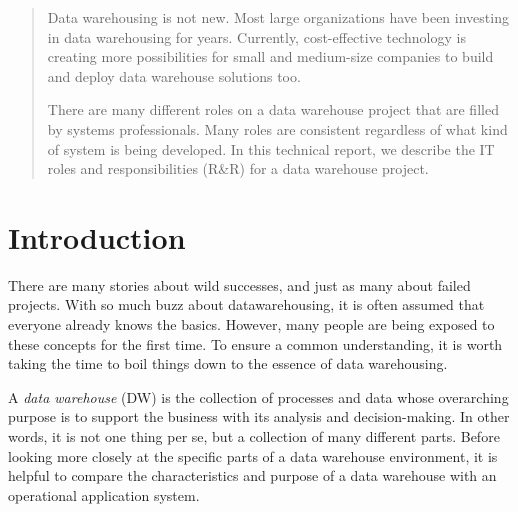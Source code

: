 \documentclass{vldb}
\begin{document}


\maketitle

\begin{abstract}
Data warehousing is not new. Most large organizations have been investing
in data warehousing for years. Currently, cost-effective technology is creating
more possibilities for small and medium-size companies to build and deploy
data warehouse solutions too.

 There are many different roles on a data warehouse project that are filled by systems professionals. Many roles are consistent regardless of what kind of system is being developed. In this technical report, we describe the IT roles and responsibilities (R\&R) for a data warehouse project.
\end{abstract}

\section{Introduction}
 There are many stories about wild successes, and
just as many about failed projects. With so much buzz about datawarehousing,
it is often assumed that everyone already knows the basics. However, many people are being exposed to these concepts for the first time. To ensure a
common understanding, it is worth taking the time to boil things down to the
essence of data warehousing.

A \textit{data warehouse} (DW) is the collection of processes and data whose overarching
purpose is to support the business with its analysis and decision-making. In
other words, it is not one thing per se, but a collection of many different
parts. Before looking more closely at the specific parts of a data warehouse
environment, it is helpful to compare the characteristics and purpose of a data
warehouse with an operational application system.
\end{document}
